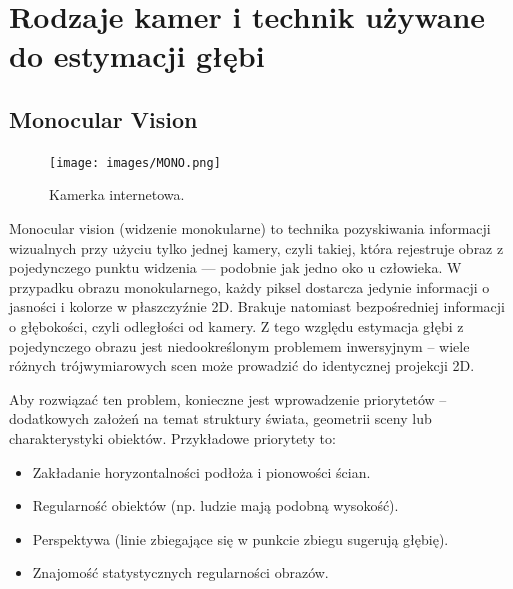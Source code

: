 \documentclass[magisterska]{pracadypl}
\begin{document}
\section{Rodzaje kamer i technik używane do estymacji głębi}

\subsection{Monocular Vision}

\begin{figure}[H]  %
    \centering  %
    \texttt{[image: images/MONO.png]}  %
    \captionsetup{font=footnotesize}
    \caption[Kamerka internetowa. https://cell-kom.com/inne/21454-kamera-internetowa-full-hd-b16-1080p-5900217390350.html]{Kamerka internetowa.}
    \label{fig:mono}  %
\end{figure}

Monocular vision (widzenie monokularne) to technika pozyskiwania informacji wizualnych przy użyciu tylko jednej kamery, czyli takiej, która rejestruje obraz z pojedynczego punktu widzenia — podobnie jak jedno oko u człowieka.
W przypadku obrazu monokularnego, każdy piksel dostarcza jedynie informacji o jasności i kolorze w płaszczyźnie 2D. Brakuje natomiast bezpośredniej informacji o głębokości, czyli odległości od kamery. Z tego względu estymacja głębi z pojedynczego obrazu jest niedookreślonym problemem inwersyjnym – wiele różnych trójwymiarowych scen może prowadzić do identycznej projekcji 2D.

Aby rozwiązać ten problem, konieczne jest wprowadzenie priorytetów – dodatkowych założeń na temat struktury świata, geometrii sceny lub charakterystyki obiektów. Przykładowe priorytety to:

\begin{itemize}
  \item Zakładanie horyzontalności podłoża i pionowości ścian.

  \item Regularność obiektów (np. ludzie mają podobną wysokość).

  \item Perspektywa (linie zbiegające się w punkcie zbiegu sugerują głębię).

  \item Znajomość statystycznych regularności obrazów.
\end{itemize}
\end{document}
